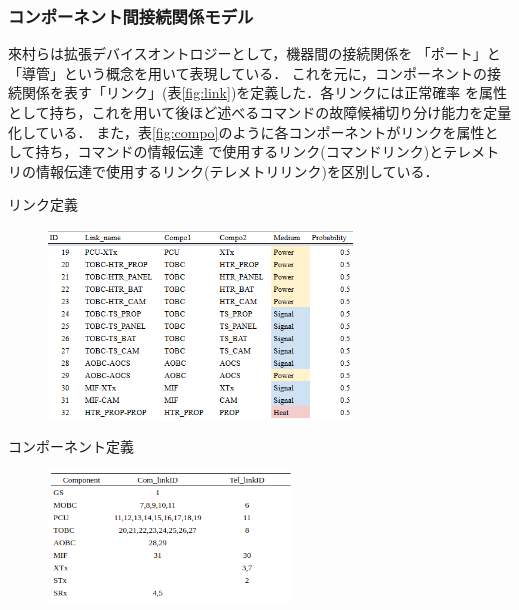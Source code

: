 \documentclass[11pt]{jsarticle}%
\begin{document}
\begin{multicols}{2}
\subsubsection{コンポーネント間接続関係モデル}
來村ら\cite{Kitamura01}は拡張デバイスオントロジーとして，機器間の接続関係を
「ポート」と「導管」という概念を用いて表現している．
これを元に，コンポーネントの接続関係を表す「リンク」(表\ref{fig:link})を定義した．各リンクには正常確率
を属性として持ち，これを用いて後ほど述べるコマンドの故障候補切り分け能力を定量化している．
また，表\ref{fig:compo}のように各コンポーネントがリンクを属性として持ち，コマンドの情報伝達
で使用するリンク(コマンドリンク)とテレメトリの情報伝達で使用するリンク(テレメトリリンク)を区別している．
\begin{table}[H]
  \centering
  \caption{リンク定義}
  \label{fig:link}
\end{table}
\vspace{-3zh}
\begin{figure}[H]
  \centering
    \includegraphics[height=5.0cm]{../figure/link_definition_resume.png}
\end{figure}
\vspace{-2zh}
\begin{table}[H]
  \centering
  \caption{コンポーネント定義}
  \label{fig:compo}
\end{table}
\vspace{-3zh}
\begin{figure}[H]
  \centering
    \includegraphics[height=3.5cm]{../figure/compo_link_resume.png}
\end{figure}
\vspace{-2zh}

\end{multicols}
\end{document}

